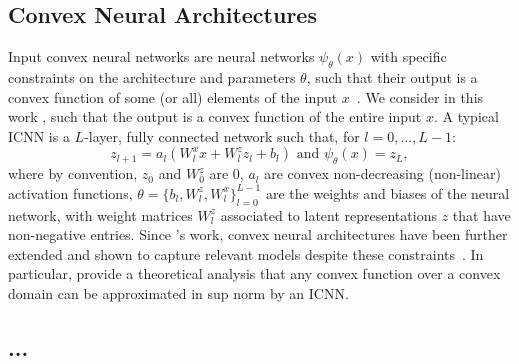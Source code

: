 \subsection{Convex Neural Architectures} \label{sec:icnns}
Input convex neural networks are neural networks $\psi_\theta(x)$ with specific constraints on the architecture and parameters $\theta$, such that their output is a convex function of some (or all) elements of the input $x$~\citep{amos2017input}. We consider in this work , such that the output is a convex function of the entire input $x$. A typical \acrshort{ICNN} is a $L$-layer, fully connected network such that, for $l = 0, \dots, L-1$:
\begin{equation} \label{eq:icnn}
    z_{l+1} = a_l(W^x_lx + W^z_l z_l + b_l)  \text{ and } \psi_\theta(x) = z_L,
\end{equation}
where by convention, $z_0$ and $W^z_0$ are $0$, $a_l$ are convex non-decreasing (non-linear) activation functions, $\theta=\{b_l, W^z_l, W^x_l\}_{l=0}^{L-1}$ are the weights and biases of the neural network, with weight matrices $W^z_l$ associated to latent representations $z$ that have non-negative entries. Since \citet{amos2017input}'s work, convex neural architectures have been further extended and shown to capture relevant models despite these constraints~\citep{amos2017input, makkuva2020optimal, huang2021convex}. In particular, \citet{chen2018optimal} provide a theoretical analysis that any convex function over a convex domain can be approximated in sup norm by an \acrshort{ICNN}.

\subsection{...}

